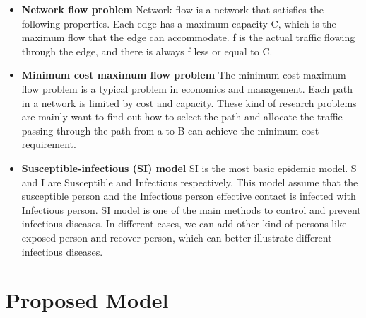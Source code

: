 \documentclass[11pt,twocolumn]{article}
\begin{document}
\begin{itemize}
    \item \textbf{Network flow problem}
    Network flow is a network that satisfies the following properties. Each edge has a maximum capacity C, which is the maximum flow that the edge can accommodate. f is the actual traffic flowing through the edge, and there is always f less or equal to C.
    \item \textbf{Minimum cost maximum flow problem}
The minimum cost maximum flow problem is a typical problem in economics and management. Each path in a network is limited by cost and capacity. These kind of research problems are mainly want to find out how to select the path and allocate the traffic passing through the path from a to B can achieve the minimum cost requirement.
    \item \textbf{Susceptible-infectious (SI) model }
    SI is the most basic epidemic model. S and I are Susceptible and Infectious respectively. This model assume that the susceptible person and the Infectious person effective contact is infected with Infectious person. SI model is one of the main methods to control and prevent infectious diseases. In different cases, we can add other kind of persons like exposed person and recover person, which can better illustrate different infectious diseases.

\end{itemize}







\section{Proposed Model}

\end{document}
